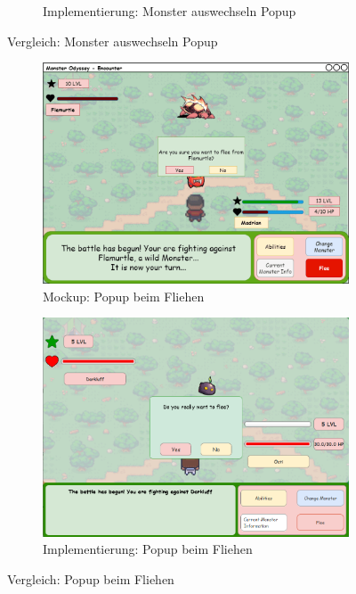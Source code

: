 \begin{figure}[H]
\begin{subfigure}[b]{0.4\textwidth}
        \caption{Implementierung: Monster auswechseln Popup}
        \label{fig: Implementierung: Monster auswechseln Popup}
    \end{subfigure}
    \caption{Vergleich: Monster auswechseln Popup}
    \label{fig: Vergleich: Monster auswechseln Popup}
\end{figure}
\begin{figure}[H]
    \centering
    \begin{subfigure}[b]{0.4\textwidth}
        \includegraphics[width=\textwidth]{images/mockups/Encounter/EncounterWildFleePopUp.png}
        \caption{Mockup: \phantom{beimFlie}Popup beim Fliehen}
        \label{fig: Mockup: Popup beim Fliehen}
    \end{subfigure}
    \hfill
    \begin{subfigure}[b]{0.4\textwidth}
        \includegraphics[width=\textwidth]{images/implementation/Encounter/fliehenpopup.PNG}
        \caption{Implementierung: Popup beim Fliehen}
        \label{fig: Implementierung: Popup beim Fliehen}
    \end{subfigure}
    \caption{Vergleich: Popup beim Fliehen}
    \label{fig: Vergleich: Popup beim Fliehen}
\end{figure}
